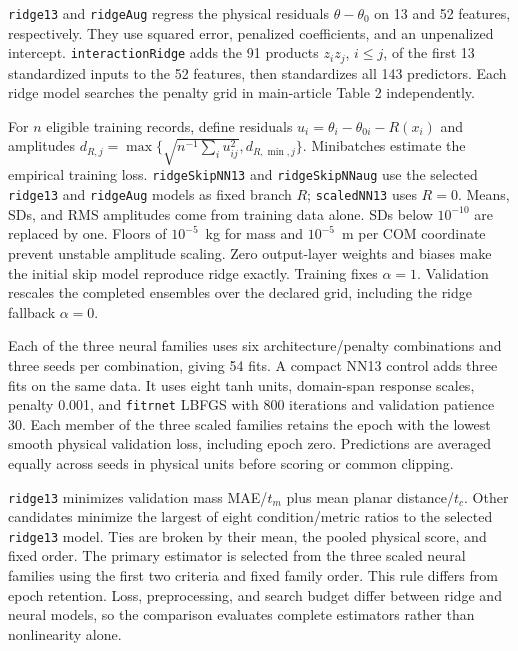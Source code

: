 \documentclass[12pt,a4paper]{article}
\begin{document}
\texttt{ridge13} and \texttt{ridgeAug} regress the physical residuals $\theta-\theta_0$
on 13 and 52 features, respectively. They use squared error, penalized
coefficients, and an unpenalized intercept. \texttt{interactionRidge} adds the
91 products $z_i z_j$, $i\leq j$, of the first 13 standardized inputs
to the 52 features, then standardizes all 143 predictors. Each ridge
model searches the penalty grid in main-article Table 2 independently.

For $n$ eligible training records, define residuals
$u_i=\theta_i-\theta_{0i}-R(x_i)$ and amplitudes
$d_{R,j}=\max\{\sqrt{n^{-1}\sum_i u_{ij}^2},d_{R,\min,j}\}$. Minibatches estimate
the empirical training loss. \texttt{ridgeSkipNN13} and \texttt{ridgeSkipNNaug} use the
selected \texttt{ridge13} and \texttt{ridgeAug} models as fixed branch $R$; \texttt{scaledNN13} uses
$R=0$. Means, SDs, and RMS amplitudes come from training data alone.
SDs below $10^{-10}$ are replaced by one. Floors of $10^{-5}$~kg for mass
and $10^{-5}$~m per COM coordinate prevent unstable amplitude scaling.
Zero output-layer weights and biases make the initial skip model reproduce
ridge exactly. Training fixes $\alpha=1$. Validation rescales the completed
ensembles over the declared grid, including the ridge fallback $\alpha=0$.

Each of the three neural families uses six architecture/penalty
combinations and three seeds per combination, giving 54 fits. A compact
NN13 control adds three fits on the same data. It uses eight tanh units,
domain-span response scales, penalty 0.001, and \texttt{fitrnet} LBFGS
with 800 iterations and validation patience 30. Each member of the three
scaled families retains the epoch with the lowest smooth physical
validation loss, including epoch zero. Predictions are averaged equally
across seeds in physical units before scoring or common clipping.

\texttt{ridge13} minimizes validation mass MAE/$t_m$ plus mean planar
distance/$t_c$. Other candidates minimize the largest of eight
condition/metric ratios to the selected \texttt{ridge13} model. Ties are broken by
their mean, the pooled physical score, and fixed order. The primary
estimator is selected from the three scaled neural families using the first
two criteria and fixed family order. This rule differs from epoch
retention. Loss, preprocessing, and search budget differ between ridge and
neural models, so the comparison evaluates complete estimators rather than
nonlinearity alone.
\end{document}
